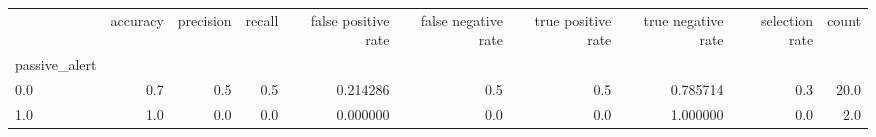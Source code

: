 \begin{tabular}{lrrrrrrrrr}
\toprule
{} &  accuracy &  precision &  recall &  false positive rate &  false negative rate &  true positive rate &  true negative rate &  selection rate &  count \\
passive\_alert &           &            &         &                      &                      &                     &                     &                 &        \\
\midrule
0.0           &       0.7 &        0.5 &     0.5 &             0.214286 &                  0.5 &                 0.5 &            0.785714 &             0.3 &   20.0 \\
1.0           &       1.0 &        0.0 &     0.0 &             0.000000 &                  0.0 &                 0.0 &            1.000000 &             0.0 &    2.0 \\
\bottomrule
\end{tabular}
